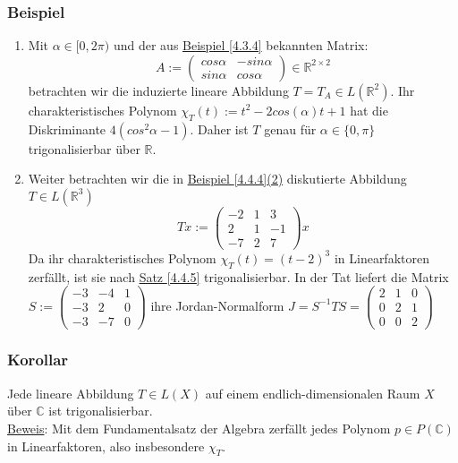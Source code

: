 \subsubsection{Beispiel}
\numbers
\begin{enumerate}
\item Mit $\alpha \in [0,2\pi )$ und der aus \hyperref[4.3.4]{Beispiel \ref{4.3.4}} bekannten Matrix:
\[A:=\begin{pmatrix}cos \alpha & -sin\alpha\\ sin\alpha & cos\alpha\end{pmatrix}\in\mathbb{R}^{2\times 2}\]
betrachten wir die induzierte lineare Abbildung $T=T_A\in L(\mathbb{R}^2)$.  Ihr charakteristisches Polynom $\chi _T(t):=t^2-2cos(\alpha )t+1$ hat die Diskriminante $4(cos^2\alpha -1)$.  Daher ist $T$ genau für $\alpha \in \{0,\pi \}$ trigonalisierbar über $\mathbb{R}$.
\item Weiter betrachten wir die in \hyperref[4.4.4]{Beispiel \ref{4.4.4}(2)} diskutierte Abbildung $T\in L(\mathbb{R}^3)$
\[Tx:=\begin{pmatrix}-2 & 1 & 3\\ 2 & 1 & -1\\ -7 & 2 & 7\end{pmatrix}x\]
Da ihr charakteristisches Polynom $\chi _T(t)=(t-2)^3$ in Linearfaktoren zerfällt, ist sie nach \hyperref[4.4.5]{Satz \ref{4.4.5}} trigonalisierbar.  In der Tat liefert die Matrix $S:=\begin{pmatrix}-3 & -4 & 1\\ -3 & 2 & 0\\ -3 & -7 & 0\end{pmatrix}$ ihre Jordan-Normalform $J=S^{-1}TS=\begin{pmatrix}2 & 1 & 0\\ 0 & 2 & 1\\ 0 & 0 & 2\end{pmatrix}$
\end{enumerate}
\subsubsection{Korollar}
Jede lineare Abbildung $T\in L(X)$ auf einem endlich-dimensionalen Raum $X$ über $\mathbb{C}$ ist trigonalisierbar.\\
\underline{Beweis}: Mit dem Fundamentalsatz der Algebra zerfällt jedes Polynom $p\in P(\mathbb{C})$ in Linearfaktoren, also insbesondere $\chi _T$.
